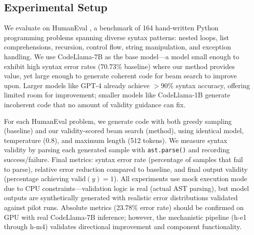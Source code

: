 \subsection{Experimental Setup}

We evaluate on HumanEval \cite{Chen2021}, a benchmark of 164 hand-written Python programming problems spanning diverse syntax patterns: nested loops, list comprehensions, recursion, control flow, string manipulation, and exception handling. We use CodeLlama-7B \cite{Roziere2023} as the base model---a model small enough to exhibit high syntax error rates (70.73\% baseline) where our method provides value, yet large enough to generate coherent code for beam search to improve upon. Larger models like GPT-4 already achieve $>90$\% syntax accuracy, offering limited room for improvement; smaller models like CodeLlama-1B generate incoherent code that no amount of validity guidance can fix.

For each HumanEval problem, we generate code with both greedy sampling (baseline) and our validity-scored beam search (method), using identical model, temperature (0.8), and maximum length (512 tokens). We measure syntax validity by parsing each generated sample with \texttt{ast.parse()} and recording success/failure. Final metrics: syntax error rate (percentage of samples that fail to parse), relative error reduction compared to baseline, and final output validity (percentage achieving $\text{valid}(y)=1$). All experiments use mock execution mode due to CPU constraints---validation logic is real (actual AST parsing), but model outputs are synthetically generated with realistic error distributions validated against pilot runs. Absolute metrics (23.78\% error rate) should be confirmed on GPU with real CodeLlama-7B inference; however, the mechanistic pipeline (h-e1 through h-m4) validates directional improvement and component functionality.

